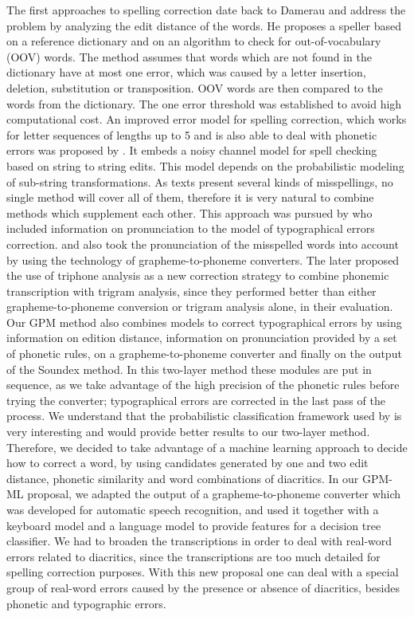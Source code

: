 The first approaches to spelling correction date back to Damerau \cite{Damerau1964} and address the problem by analyzing the edit distance of the words. He proposes a speller based on a reference dictionary and on an algorithm to check for out-of-vocabulary (OOV) words. The method assumes that words which are not found in the dictionary have at most one error, which was caused by a letter insertion, deletion, substitution or transposition. OOV words are then compared to the words from the dictionary. The one error threshold was established to avoid high computational cost.
An improved error model for spelling correction, which works for letter sequences of lengths up to 5 and is also able to deal with phonetic errors was proposed by \cite{Brill2000}. It embeds a noisy channel model for spell checking based on string to string edits. This model depends on the probabilistic modeling of sub-string transformations. 
As texts present several kinds of misspellings, no single method will cover all of them, therefore it is very natural to combine methods which supplement each other. This approach was pursued by \cite{Toutanova2002} who included information on pronunciation to the model of typographical errors correction. \cite{Toutanova2002} and also \cite{Berkel1988} took the pronunciation of the misspelled words into account by using the technology of grapheme-to-phoneme converters. The later proposed the use of triphone analysis as a new correction strategy to combine phonemic transcription with trigram analysis, since they performed better than either grapheme-to-phoneme conversion or trigram analysis alone, in their evaluation. 
Our GPM method also combines models to correct typographical errors by using information on edition distance, information on pronunciation provided by a set of phonetic rules, on a grapheme-to-phoneme converter and finally on the output of the Soundex method. In this two-layer method these modules are put in sequence, as we take advantage of the high precision of the phonetic rules before trying the converter; typographical errors are corrected in the last pass of the process. We understand that the probabilistic classification framework used by \cite{Toutanova2002} is very interesting and would provide better results to our two-layer method. Therefore, we decided to take advantage of a machine learning approach to decide how to correct a word, by using candidates generated by one and two edit distance, phonetic similarity and word combinations of diacritics. In our GPM-ML proposal, we adapted the output of a grapheme-to-phoneme converter which was developed for automatic speech recognition, and used it together with a keyboard model and a language model to provide features for a decision tree classifier.  We had to broaden the transcriptions in order to deal with real-word errors related to diacritics, since the transcriptions are too much detailed for spelling correction purposes. With this new proposal one can deal with a special group of real-word errors caused by the presence or absence of diacritics, besides phonetic and typographic errors.

